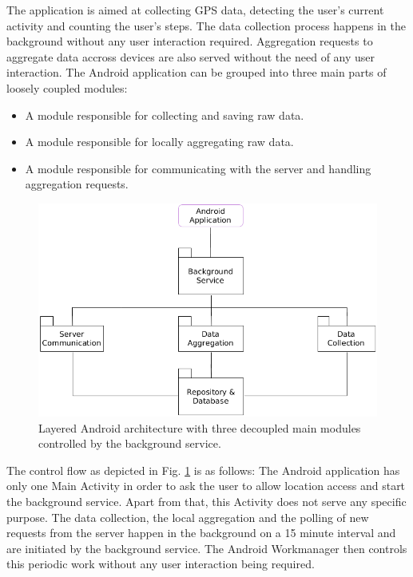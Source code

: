\begin{samepage}
The application is aimed at collecting GPS data, detecting the user's current activity and counting the user's steps. The data collection process happens in the background without any user interaction required. Aggregation requests to aggregate data accross devices are also served without the need of any user interaction.
The Android application can be grouped into three main parts of loosely coupled modules:
\begin{itemize}
	\item A module responsible for collecting and saving raw data.
	\item A module responsible for locally aggregating raw data.
	\item A module responsible for communicating with the server and handling aggregation requests.
\end{itemize}
\end{samepage}

\begin{figure}[h!]
  \includegraphics[width=\textwidth]{data/diagrams/android-architecture.png}
  \caption{Layered Android architecture with three decoupled main modules controlled by the background service.}
  \label{android-overview}
\end{figure}

The control flow as depicted in Fig. \ref{android-overview} is as follows: 
The Android application has only one Main Activity in order to ask the user to allow location access and start the background service. Apart from that, this Activity does not serve any specific purpose. 
The data collection, the local aggregation and the polling of new requests from the server happen in the background on a 15 minute interval and are initiated by the background service. The Android Workmanager then controls this periodic work without any user interaction being required.

